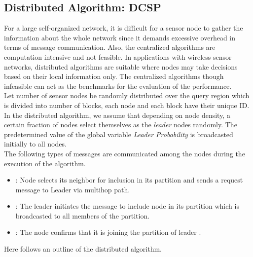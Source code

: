 \documentclass{acm_proc_article-sp}
\begin{document}
\subsection{\bf Distributed Algorithm: DCSP}
For a large self-organized network, it is difficult for a sensor node to gather the information about the whole network since it demands excessive overhead in terms of message communication. Also, the centralized algorithms are computation intensive and not feasible. In applications with wireless sensor networks, distributed algorithms are suitable where nodes may take decisions based on their local information only. The centralized algorithms though infeasible can act as the benchmarks for the evaluation of the performance.\\
Let  number of sensor nodes be randomly distributed over the query region  which is divided into  number of blocks, each node and each block have their unique ID. In the distributed algorithm, we assume that depending on node density, a certain fraction of nodes select themselves as the {\it leader} nodes randomly. The predetermined value of the global variable {\it Leader Probability}  is broadcasted initially to all nodes.\\
The following types of messages are communicated among the nodes during the execution of the algorithm. 
\vspace{-0.5cm}
\begin{itemize}
\item : Node  selects its neighbor  for inclusion in its partition and sends a request message to Leader  via multihop path.
\item : The leader  initiates the message to include node  in its partition which is broadcasted to all members of the partition.
\item : The node  confirms that it is joining the partition of leader .
\end{itemize}
\vspace{-0.5cm}
 Here follows an outline of the distributed algorithm.
\end{document}
